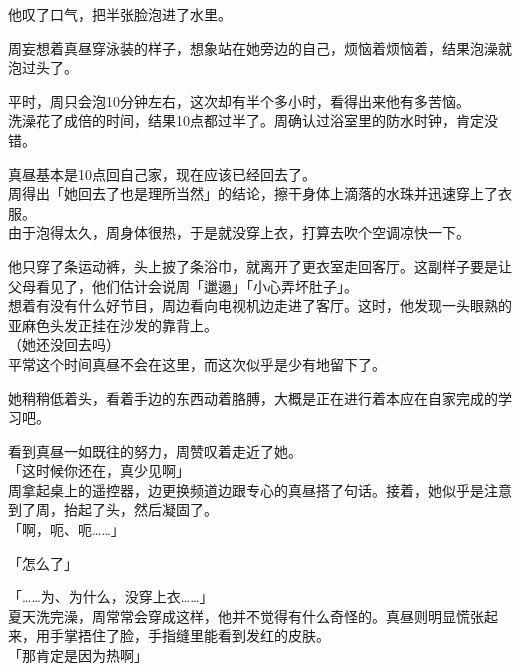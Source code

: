 他叹了口气，把半张脸泡进了水里。\\

\vspace{2\baselineskip}

周妄想着真昼穿泳装的样子，想象站在她旁边的自己，烦恼着烦恼着，结果泡澡就泡过头了。

平时，周只会泡10分钟左右，这次却有半个多小时，看得出来他有多苦恼。\\

洗澡花了成倍的时间，结果10点都过半了。周确认过浴室里的防水时钟，肯定没错。

真昼基本是10点回自己家，现在应该已经回去了。\\

周得出「她回去了也是理所当然」的结论，擦干身体上滴落的水珠并迅速穿上了衣服。\\

由于泡得太久，周身体很热，于是就没穿上衣，打算去吹个空调凉快一下。

他只穿了条运动裤，头上披了条浴巾，就离开了更衣室走回客厅。这副样子要是让父母看见了，他们估计会说周「邋遢」「小心弄坏肚子」。\\

想着有没有什么好节目，周边看向电视机边走进了客厅。这时，他发现一头眼熟的亚麻色头发正挂在沙发的靠背上。\\

（她还没回去吗）\\

平常这个时间真昼不会在这里，而这次似乎是少有地留下了。

她稍稍低着头，看着手边的东西动着胳膊，大概是正在进行着本应在自家完成的学习吧。

看到真昼一如既往的努力，周赞叹着走近了她。\\

「这时候你还在，真少见啊」\\

周拿起桌上的遥控器，边更换频道边跟专心的真昼搭了句话。接着，她似乎是注意到了周，抬起了头，然后凝固了。\\

「啊，呃、呃……」

「怎么了」

「……为、为什么，没穿上衣……」\\

夏天洗完澡，周常常会穿成这样，他并不觉得有什么奇怪的。真昼则明显慌张起来，用手掌捂住了脸，手指缝里能看到发红的皮肤。\\

「那肯定是因为热啊」

